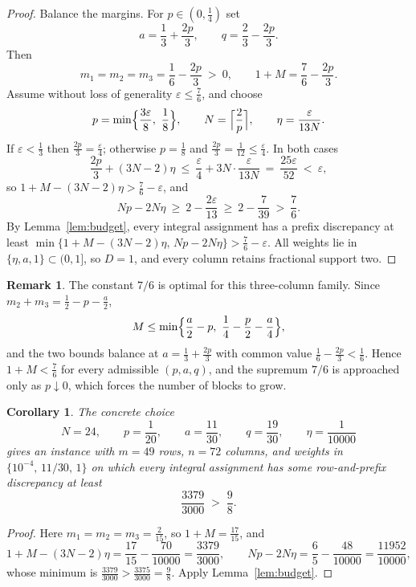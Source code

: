 \documentclass[11pt]{article}
\newtheorem{corollary}[theorem]{Corollary}
\theoremstyle{definition}
\newtheorem{remark}[theorem]{Remark}
\newcommand{\eps}{\varepsilon}
\begin{document}
\begin{proof}
Balance the margins.  For $p\in(0,\tfrac14)$ set
\[
 a=\frac13+\frac{2p}3,
 \qquad
 q=\frac23-\frac{2p}3 .
\]
Then
\[
 m_1=m_2=m_3=\frac16-\frac{2p}3\ >\ 0,
 \qquad
 1+M=\frac76-\frac{2p}3 .
\]
Assume without loss of generality $\eps\le\tfrac76$, and choose
\[
 p=\min\Bigl\{\frac{3\eps}8,\ \frac18\Bigr\},
 \qquad
 N=\Bigl\lceil\frac2p\Bigr\rceil,
 \qquad
 \eta=\frac{\eps}{13N}.
\]
If $\eps<\tfrac13$ then $\frac{2p}3=\frac\eps4$; otherwise $p=\tfrac18$ and
$\frac{2p}3=\frac1{12}\le\frac\eps4$.  In both cases
\[
 \frac{2p}3+(3N-2)\eta
 \ \le\
 \frac{\eps}4+3N\cdot\frac{\eps}{13N}
 \ =\
 \frac{25\eps}{52}
 \ <\ \eps,
\]
so $1+M-(3N-2)\eta>\frac76-\eps$, and
\[
 Np-2N\eta\ \ge\ 2-\frac{2\eps}{13}\ \ge\ 2-\frac7{39}\ >\ \frac76 .
\]
By Lemma~\ref{lem:budget}, every integral assignment has a prefix
discrepancy at least
$\min\{1+M-(3N-2)\eta,\,Np-2N\eta\}>\frac76-\eps$.
All weights lie in $\{\eta,a,1\}\subset(0,1]$, so $D=1$, and every column
retains fractional support two.
\end{proof}

\begin{remark}\label{rem:optimal}
The constant $7/6$ is optimal for this three-column family.  Since
$m_2+m_3=\frac12-p-\frac a2$,
\[
 M\le\min\Bigl\{\frac a2-p,\ \frac14-\frac p2-\frac a4\Bigr\},
\]
and the two bounds balance at $a=\frac13+\frac{2p}3$ with common value
$\frac16-\frac{2p}3<\frac16$.  Hence $1+M<\frac76$ for every admissible
$(p,a,q)$, and the supremum $7/6$ is approached only as $p\downarrow0$,
which forces the number of blocks to grow.
\end{remark}

\begin{corollary}\label{cor:nine-eighths}
The concrete choice
\[
 N=24,\qquad p=\frac1{20},\qquad a=\frac{11}{30},
 \qquad q=\frac{19}{30},\qquad\eta=\frac1{10000}
\]
gives an instance with $m=49$ rows, $n=72$ columns, and weights in
$\{10^{-4},\,11/30,\,1\}$ on which every integral assignment has some
row-and-prefix discrepancy at least
\[
 \frac{3379}{3000}\;>\;\frac98 .
\]
\end{corollary}

\begin{proof}
Here $m_1=m_2=m_3=\frac2{15}$, so $1+M=\frac{17}{15}$, and
\[
 1+M-(3N-2)\eta=\frac{17}{15}-\frac{70}{10000}=\frac{3379}{3000},
 \qquad
 Np-2N\eta=\frac65-\frac{48}{10000}=\frac{11952}{10000},
\]
whose minimum is $\frac{3379}{3000}>\frac{3375}{3000}=\frac98$.
Apply Lemma~\ref{lem:budget}.
\end{proof}
\end{document}

